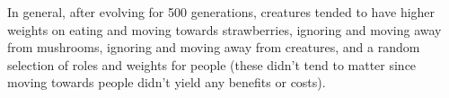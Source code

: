 \documentclass{article}
\begin{document}
In general, after evolving for 500 generations, creatures tended to have higher weights on eating and moving towards strawberries, ignoring and moving away from mushrooms, ignoring and moving away from creatures, and a random selection of roles and weights for people (these didn't tend to matter since moving towards people didn't yield any benefits or costs).  \\ \\
\end{document}

